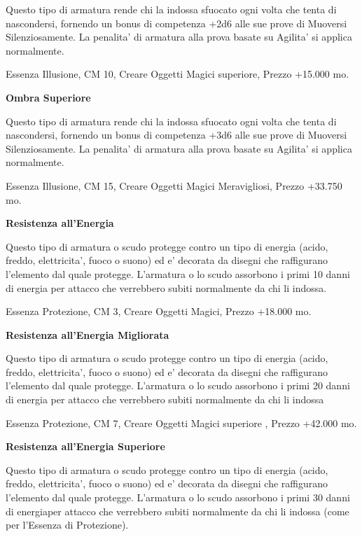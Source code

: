 \documentclass[a4paper,11pt,twoside,openany]{book}
\begin{document}
{		Questo tipo di armatura rende chi la indossa sfuocato ogni volta che tenta di nascondersi, fornendo un bonus di competenza +2d6 alle sue prove di Muoversi Silenziosamente. La penalita' di armatura alla prova basate su Agilita' si applica normalmente.
		
		Essenza Illusione, CM 10, Creare Oggetti Magici superiore, Prezzo
		+15.000 mo.
		
		\textbf{Ombra Superiore}
		
		Questo tipo di armatura rende chi la indossa sfuocato ogni volta che
		tenta di nascondersi, fornendo un bonus di competenza +3d6 alle sue
		prove di Muoversi Silenziosamente. La penalita' di armatura alla prova
		basate su Agilita' si applica normalmente.
		
		Essenza Illusione, CM 15, Creare Oggetti Magici Meravigliosi, Prezzo
		+33.750 mo.
		
		\textbf{Resistenza all'Energia}
		
		Questo tipo di armatura o scudo protegge contro un tipo di energia (acido, freddo, elettricita', fuoco o suono) ed e' decorata da disegni che raffigurano l'elemento dal quale protegge. L'armatura o lo scudo assorbono i primi 10 danni di energia per attacco che verrebbero subiti normalmente da chi li indossa.
		
		Essenza Protezione, CM 3, Creare Oggetti Magici, Prezzo +18.000 mo.
		
		\textbf{Resistenza all'Energia Migliorata}
		
		Questo tipo di armatura o scudo protegge contro un tipo di energia
		(acido, freddo, elettricita', fuoco o suono) ed e' decorata da disegni
		che raffigurano l'elemento dal quale protegge. L'armatura o lo scudo
		assorbono i primi 20 danni di energia per attacco che verrebbero subiti
		normalmente da chi li indossa
		
		Essenza Protezione, CM 7, Creare Oggetti Magici superiore , Prezzo
		+42.000 mo.
		
		\textbf{Resistenza all'Energia Superiore}
		
		Questo tipo di armatura o scudo protegge contro un tipo di energia (acido, freddo, elettricita', fuoco o suono) ed e' decorata da disegni che raffigurano l'elemento dal quale protegge. L'armatura o lo scudo assorbono i primi 30 danni di energiaper attacco che verrebbero subiti normalmente da chi li indossa (come per l'Essenza di Protezione).
		
}
\end{document}
